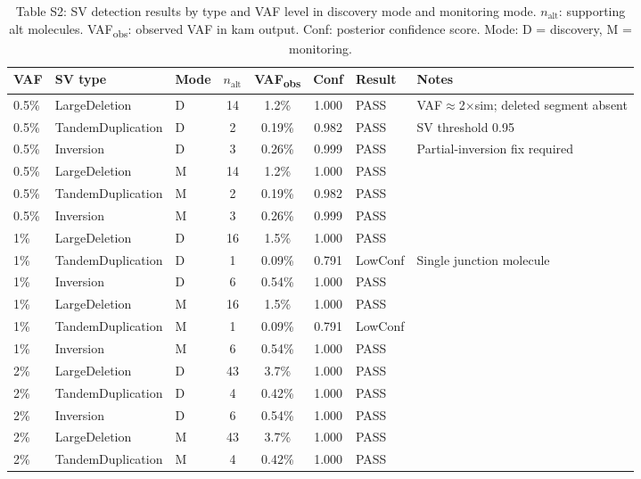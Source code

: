 \begin{table}[h]
  \centering
  \caption{Table S2: SV detection results by type and VAF level in discovery
    mode and monitoring mode.
    $n_\text{alt}$: supporting alt molecules.
    VAF\textsubscript{obs}: observed VAF in kam output.
    Conf: posterior confidence score.
    Mode: D = discovery, M = monitoring.}
  \label{tab:s2-sv}
  \small
  \begin{tabular}{lllcccll}
    \toprule
    VAF & SV type & Mode & $n_\text{alt}$ & VAF\textsubscript{obs} & Conf & Result & Notes \\
    \midrule
    0.5\% & LargeDeletion     & D & 14 & 1.2\%  & 1.000 & PASS    & VAF$\approx$2$\times$sim; deleted segment absent \\
    0.5\% & TandemDuplication & D & 2  & 0.19\% & 0.982 & PASS    & SV threshold 0.95 \\
    0.5\% & Inversion         & D & 3  & 0.26\% & 0.999 & PASS    & Partial-inversion fix required \\
    0.5\% & LargeDeletion     & M & 14 & 1.2\%  & 1.000 & PASS    & \\
    0.5\% & TandemDuplication & M & 2  & 0.19\% & 0.982 & PASS    & \\
    0.5\% & Inversion         & M & 3  & 0.26\% & 0.999 & PASS    & \\
    \midrule
    1\%   & LargeDeletion     & D & 16 & 1.5\%  & 1.000 & PASS    & \\
    1\%   & TandemDuplication & D & 1  & 0.09\% & 0.791 & LowConf & Single junction molecule \\
    1\%   & Inversion         & D & 6  & 0.54\% & 1.000 & PASS    & \\
    1\%   & LargeDeletion     & M & 16 & 1.5\%  & 1.000 & PASS    & \\
    1\%   & TandemDuplication & M & 1  & 0.09\% & 0.791 & LowConf & \\
    1\%   & Inversion         & M & 6  & 0.54\% & 1.000 & PASS    & \\
    \midrule
    2\%   & LargeDeletion     & D & 43 & 3.7\%  & 1.000 & PASS    & \\
    2\%   & TandemDuplication & D & 4  & 0.42\% & 1.000 & PASS    & \\
    2\%   & Inversion         & D & 6  & 0.54\% & 1.000 & PASS    & \\
    2\%   & LargeDeletion     & M & 43 & 3.7\%  & 1.000 & PASS    & \\
    2\%   & TandemDuplication & M & 4  & 0.42\% & 1.000 & PASS    & \\

\end{tabular}
\end{table}
